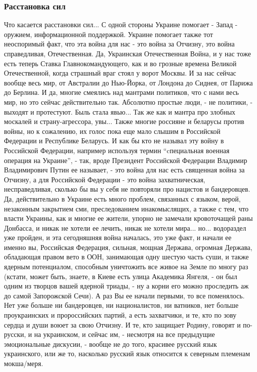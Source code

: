  
 
 
 
 

\subsubsection{Расстановка сил}

Что касается расстановки сил... С одной стороны Украине помогает - Запад -
оружием, информационной поддержкой.  Украине помогает также тот неоспоримый
факт, что эта война для нас - это война за Отчизну, это война справедливая,
Отечественная. Да, Украинская Отечественная Война, и у нас тоже есть теперь
Ставка Главнокомандующего, как и во грозные времена Великой Отечественной,
когда страшный враг стоял у ворот Москвы.  И за нас сейчас вообще весь мир, от
Австралии до Нью-Йорка, от Лондона до Сиднея, от Парижа до Берлина. И да,
многие смеялись над мантрами политиков, что с нами весь мир, но это сейчас
действительно так. Абсолютно простые люди, - не политики, - выходят и
протестуют.  Быль стала явью... Так же как и мантра про злобных москалей и
страну-агрессора, увы...  Также многие россияне и беларусы против войны, но к
сожалению, их голос пока еще мало слышим в Российской Федерации и Республике
Беларусь. И как бы кто не называл эту войну в Российской Федерации, например
используя термин \enquote{cпециальная военная операция на Украине}, - так,
вроде Президент Российской Федерации Владимир Владимирович Путин ее называет, -
это война для нас есть священная война за Отчизну, а для Российской Федерации -
это война захватническая, несправедливая, сколько бы вы у себя не
повторяли про нацистов и бандеровцев. Да, действительно в Украине есть много
проблем, связанных с языком, верой, незаконным закрытием сми, преследованием
инакомыслящих, а также с тем, что власти Украины, как и многие ее жители,
упорно не замечали кровоточащей раны Донбасса, и никак не хотели ее лечить,
никак не хотели мира... но... водораздел уже пройден, и эта сегодняшняя война
началась, это уже факт, и начали ее именно вы, Российская Федерация, сильная,
мощная Держава, огромная Держава, обладающая правом вето в ООН, занимающая одну
шестую часть суши, и также ядерным потенциалом, способным уничтожить все живое
на Земле по многу раз (кстати, может быть, знаете, в Киеве есть улица Академика
Янгеля, - он был одним из творцов вашей ядерной триады, - ну а корни его можно
проследить аж до самой Запорожской Сечи). А раз Вы ее начали первыми, то все
поменялось.  Нет уже больше ни бандеровцев, ни националистов, ни ватников, нет
больше проукраинских и пророссийских партий, а есть захватчики, и те, кто по
зову сердца и души воюет за свою Отчизну. И те, кто защищает Родину, говорят и
по-русски, и на украинском, и сейчас им, - несмотря на все предыдущие
эмоциональные дискусии, - вообще не до того, красивее русский язык украинского,
или же то, насколько русский язык относится к северным племенам мокша/меря.

